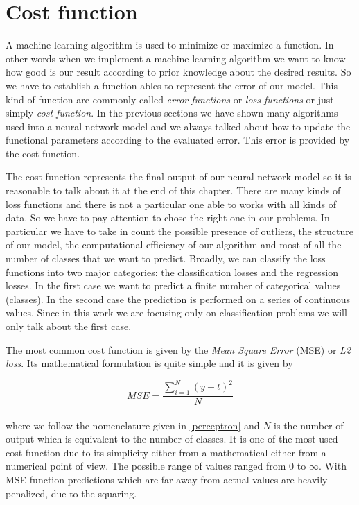 \documentclass{standalone}
\begin{document}
\section[Cost function]{Cost function}\label{cost}

A machine learning algorithm is used to minimize or maximize a function.
In other words when we implement a machine learning algorithm we want to know how good is our result according to prior knowledge about the desired results.
So we have to establish a function ables to represent the error of our model.
This kind of function are commonly called \emph{error functions} or \emph{loss functions} or just simply \emph{cost function}.
In the previous sections we have shown many algorithms used into a neural network model and we always talked about how to update the functional parameters according to the evaluated error.
This error is provided by the cost function.

The cost function represents the final output of our neural network model so it is reasonable to talk about it at the end of this chapter.
There are many kinds of loss functions and there is not a particular one able to works with all kinds of data.
So we have to pay attention to chose the right one in our problems.
In particular we have to take in count the possible presence of outliers, the structure of our model, the computational efficiency of our algorithm and most of all the number of classes that we want to predict.
Broadly, we can classify the loss functions into two major categories: the classification losses and the regression losses.
In the first case we want to predict a finite number of categorical values (classes).
In the second case the prediction is performed on a series of continuous values.
Since in this work we are focusing only on classification problems we will only talk about the first case.

The most common cost function is given by the \emph{Mean Square Error} (MSE) or \emph{L2 loss}.
Its mathematical formulation is quite simple and it is given by

$$
MSE = \frac{\sum_{i=1}^{N}\left( y - t \right)^2}{N}
$$
\\
where we follow the nomenclature given in \ref{perceptron} and $N$ is the number of output which is equivalent to the number of classes.
It is one of the most used cost function due to its simplicity either from a mathematical either from a numerical point of view.
The possible range of values ranged from 0 to $\infty$.
With MSE function predictions which are far away from actual values are heavily penalized, due to the squaring.
\end{document}
